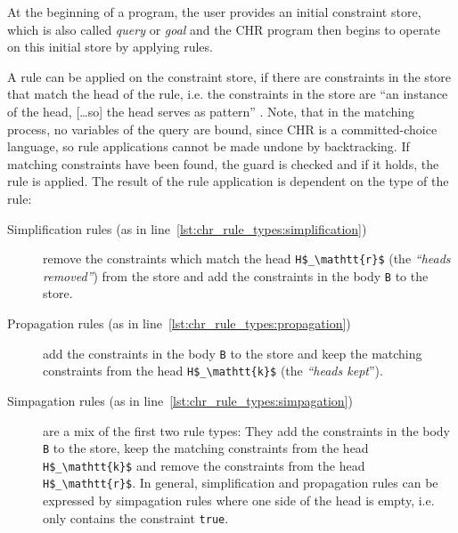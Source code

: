 At the beginning of a program, the user provides an initial constraint store, which is also called \emph{query} or \emph{goal} and the CHR program then begins to operate on this initial store by applying rules.

A rule can be applied on the constraint store, if there are constraints in the store that match the head of the rule, i.e. the constraints in the store are ``an instance of the head, [\dots so] the head serves as pattern'' \cite[11]{fru_chr_book_2009}. Note, that in the matching process, no variables of the query are bound, since CHR is a committed-choice language, so rule applications cannot be made undone by backtracking. If matching constraints have been found, the guard is checked and if it holds, the rule is applied. The result of the rule application is dependent on the type of the rule:

\begin{description}
 \item[Simplification rules (as in line~\ref{lst:chr_rule_types:simplification})] remove the constraints which match the head \lstinline[mathescape]|H$_\mathtt{r}$| (the \emph{``heads removed''}) from the store and add the constraints in the body \lstinline|B| to the store.
 \item[Propagation rules (as in line~\ref{lst:chr_rule_types:propagation})] add the constraints in the body \lstinline|B| to the store and keep the matching constraints from the head \lstinline[mathescape]|H$_\mathtt{k}$| (the \emph{``heads kept}'').
 \item[Simpagation rules (as in line~\ref{lst:chr_rule_types:simpagation})] are a mix of the first two rule types: They add the constraints in the body \lstinline|B| to the store, keep the matching constraints from the head \lstinline[mathescape]|H$_\mathtt{k}$| and remove the constraints from the head \lstinline[mathescape]|H$_\mathtt{r}$|. In general, simplification and propagation rules can be expressed by simpagation rules where one side of the head is empty, i.e. only contains the constraint \lstinline|true|.
\end{description}

